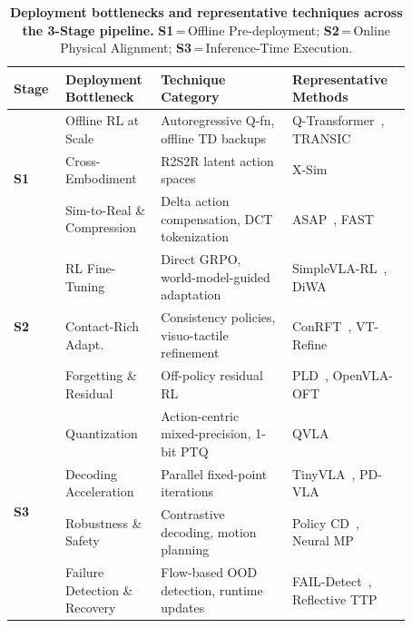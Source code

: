 \documentclass[acmsmall,screen,review]{acmart}
\begin{document}
\begin{table}[!t]
\centering
\caption{\textbf{Deployment bottlenecks and representative techniques across the 3-Stage pipeline.}
\textbf{S1}\,=\,Offline Pre-deployment; \textbf{S2}\,=\,Online Physical Alignment; \textbf{S3}\,=\,Inference-Time Execution.}\label{tab:deployment_lifecycle}
\renewcommand{\arraystretch}{1.15}
\setlength{\tabcolsep}{3pt}
\scriptsize
\begin{tabular}{
  l
  p{0.24\linewidth}
  p{0.33\linewidth}
  p{0.30\linewidth}
}
\toprule
\textbf{Stage} & \textbf{Deployment Bottleneck} & \textbf{Technique Category} & \textbf{Representative Methods} \\
\midrule
\multirow{3}{*}{\textbf{S1}}
 & Offline RL at Scale & Autoregressive Q-fn, offline TD backups & Q-Transformer~\cite{chebotar2023qtransformer}, TRANSIC~\cite{jiang2025transic} \\
 & Cross-Embodiment & R2S2R latent action spaces & X-Sim~\cite{dan2025xsim} \\
 & Sim-to-Real \& Compression & Delta action compensation, DCT tokenization & ASAP~\cite{he2025asap}, FAST~\cite{pertsch2025fast} \\
\midrule
\multirow{3}{*}{\textbf{S2}}
 & RL Fine-Tuning & Direct GRPO, world-model-guided adaptation & SimpleVLA-RL~\cite{li2026simplevlarl}, DiWA~\cite{chandra2025diwa} \\
 & Contact-Rich Adapt. & Consistency policies, visuo-tactile refinement & ConRFT~\cite{chen2025conrft}, VT-Refine~\cite{huang2025vtrefine} \\
 & Forgetting \& Residual & Off-policy residual RL & PLD~\cite{xiao2025pld}, OpenVLA-OFT~\cite{kim2025oft} \\
\midrule
\multirow{4}{*}{\textbf{S3}}
 & Quantization & Action-centric mixed-precision, 1-bit PTQ & QVLA~\cite{xu2026qvla} \\
 & Decoding Acceleration & Parallel fixed-point iterations & TinyVLA~\cite{wen2025tinyvla}, PD-VLA~\cite{pdvla2025} \\
 & Robustness \& Safety & Contrastive decoding, motion planning & Policy CD~\cite{wu2026policycontrastive}, Neural MP~\cite{dalal2024neuralmp} \\
 & Failure Detection \& Recovery & Flow-based OOD detection, runtime updates & FAIL-Detect~\cite{xu2025detectfailures}, Reflective TTP~\cite{hong2026rttp} \\
\bottomrule
\end{tabular}
\end{table}
\end{document}

